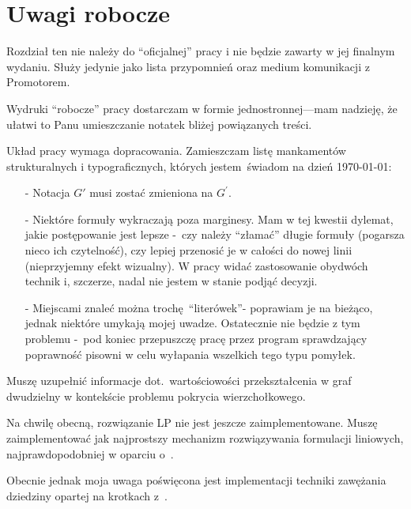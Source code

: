 \chapter{Uwagi robocze}\label{section_notes}
\par{
  Rozdział ten nie należy do ``oficjalnej'' pracy i nie będzie zawarty w jej
 finalnym wydaniu.
 Służy jedynie jako lista przypomnień oraz medium komunikacji z Promotorem.
}
\begin{note}
  Wydruki ``robocze'' pracy dostarczam w formie jednostronnej---mam nadzieję, że
  ułatwi to Panu umieszczanie notatek bliżej powiązanych treści.
\end{note}
\begin{note}
  Układ pracy wymaga dopracowania.
  Zamieszczam listę mankamentów strukturalnych i typograficznych, których 
  jestem świadom na dzień \today:
  \begin{itemize}
    \item[-] Notacja $G\prime$ musi zostać zmieniona na $G^{\prime}$.
    \item[-] Niektóre formuły wykraczają poza marginesy.
      Mam w tej kwestii dylemat, jakie postępowanie jest lepsze -~czy należy
      ``złamać'' długie formuły (pogarsza nieco ich czytelność), czy lepiej 
      przenosić je w całości do nowej linii (nieprzyjemny efekt wizualny).
      W pracy widać zastosowanie obydwóch technik i, szczerze, nadal nie jestem
      w stanie podjąć decyzji.
    \item[-] Miejscami znaleć można trochę ``literówek''- poprawiam je na
      bieżąco, jednak niektóre umykają mojej uwadze.
      Ostatecznie nie będzie z tym problemu -~pod koniec przepuszczę pracę przez
      program sprawdzający poprawność pisowni w celu wyłapania wszelkich tego
      typu pomyłek.
  \end{itemize}
\end{note}
\begin{note}
  Muszę uzupełnić informacje dot.\ wartościowości przekształcenia w graf
  dwudzielny w kontekście problemu pokrycia wierzchołkowego.
\end{note}
\begin{note}
  Na chwilę obecną, rozwiązanie LP nie jest jeszcze zaimplementowane.
  Muszę zaimplementować jak najprostszy mechanizm rozwiązywania formulacji
  liniowych, najprawdopodobniej w oparciu o~\cite{sedgewick11}.


  Obecnie jednak moja uwaga poświęcona jest implementacji techniki zawężania dziedziny
  opartej na krotkach z~\cite{ImprovedBounds10}.
\end{note}

